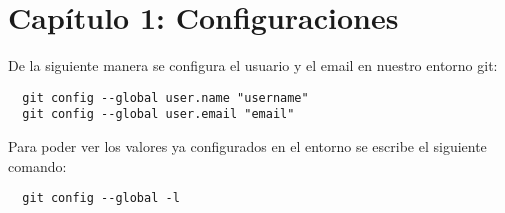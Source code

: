 \section{Capítulo 1: Configuraciones}
De la siguiente manera se configura el usuario y el email en nuestro entorno git:

\begin{lstlisting}
  git config --global user.name "username"
  git config --global user.email "email"
\end{lstlisting}

Para poder ver los valores ya configurados en el entorno se escribe el siguiente comando:

\begin{lstlisting}
  git config --global -l
\end{lstlisting}

